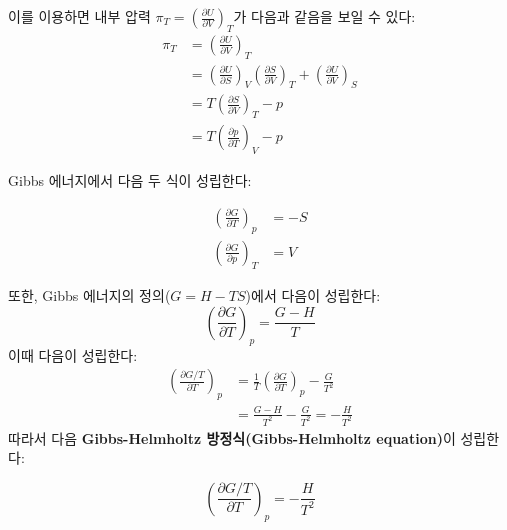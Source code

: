         이를 이용하면 내부 압력 $\pi_T = \left(\frac{\partial U}{\partial V}\right)_T$가 다음과 같음을 보일 수 있다:
        \begin{equation*}
            \begin{aligned}
                \pi_T &= \left(\frac{\partial U}{\partial V}\right)_T\\
                &= \left(\frac{\partial U}{\partial S}\right)_V \left(\frac{\partial S}{\partial V}\right)_T + \left(\frac{\partial U}{\partial V}\right)_S\\
                &= T\left(\frac{\partial S}{\partial V}\right)_T -p\\
                &= T\left(\frac{\partial p}{\partial T}\right)_V -p
            \end{aligned}
        \end{equation*}
        \par Gibbs 에너지에서 다음 두 식이 성립한다:
        \begin{cor}\label{gibbspartial}
        \begin{align*}
            \left(\frac{\partial G}{\partial T}\right)_p &= -S\\
            \left(\frac{\partial G}{\partial p}\right)_T &= V
        \end{align*}
        \end{cor}
        \par 또한, Gibbs 에너지의 정의($G = H - TS$)에서 다음이 성립한다:
        \begin{equation*}
            \left(\frac{\partial G}{\partial T}\right)_p = \frac{G-H}{T}
        \end{equation*}
        이때 다음이 성립한다:
        \begin{equation*}
            \begin{aligned}
                \left(\frac{\partial G/T}{\partial T}\right)_p &= \frac{1}{T}\left(\frac{\partial G}{\partial T}\right)_p -\frac{G}{T^2} \\
                &= \frac{G-H}{T^2}-\frac{G}{T^2} = -\frac{H}{T^2}
            \end{aligned}
        \end{equation*}
        따라서 다음 \textbf{Gibbs-Helmholtz 방정식(Gibbs-Helmholtz equation)}이 성립한다:
        \begin{law}\label{gheqn}
        \begin{equation*}
            \left(\frac{\partial G/T}{\partial T}\right)_p = -\frac{H}{T^2}
        \end{equation*}
        \end{law}
